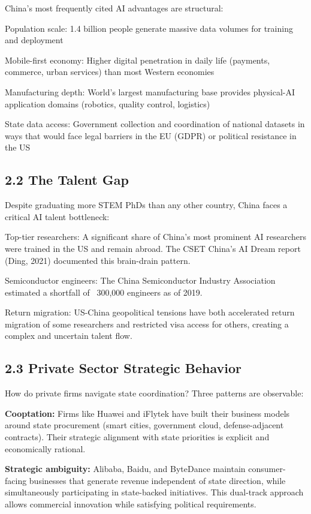 \documentclass[11pt,a4paper]{article}
\begin{document}
China's most frequently cited AI advantages are structural:
\item Population scale: 1.4 billion people generate massive data volumes for training and deployment
\item Mobile-first economy: Higher digital penetration in daily life (payments, commerce, urban services) than most Western economies
\item Manufacturing depth: World's largest manufacturing base provides physical-AI application domains (robotics, quality control, logistics)
\item State data access: Government collection and coordination of national datasets in ways that would face legal barriers in the EU (GDPR) or political resistance in the US

\subsection{2.2 The Talent Gap}

Despite graduating more STEM PhDs than any other country, China faces a critical AI talent bottleneck:
\item Top-tier researchers: A significant share of China's most prominent AI researchers were trained in the US and remain abroad. The CSET China's AI Dream report (Ding, 2021) documented this brain-drain pattern.
\item Semiconductor engineers: The China Semiconductor Industry Association estimated a shortfall of ~300,000 engineers as of 2019.
\item Return migration: US-China geopolitical tensions have both accelerated return migration of some researchers and restricted visa access for others, creating a complex and uncertain talent flow.

\subsection{2.3 Private Sector Strategic Behavior}

How do private firms navigate state coordination? Three patterns are observable:

\textbf{Cooptation:} Firms like Huawei and iFlytek have built their business models around state procurement (smart cities, government cloud, defense-adjacent contracts). Their strategic alignment with state priorities is explicit and economically rational.

\textbf{Strategic ambiguity:} Alibaba, Baidu, and ByteDance maintain consumer-facing businesses that generate revenue independent of state direction, while simultaneously participating in state-backed initiatives. This dual-track approach allows commercial innovation while satisfying political requirements.
\end{document}
